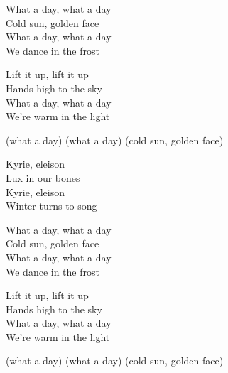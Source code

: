 \begin{lyrics}
What a day, what a day\\
Cold sun, golden face\\
What a day, what a day\\
We dance in the frost

Lift it up, lift it up\\
Hands high to the sky\\
What a day, what a day\\
We’re warm in the light

(what a day) (what a day)
(cold sun, golden face)

Kyrie, eleison\\
Lux in our bones\\
Kyrie, eleison\\
Winter turns to song

What a day, what a day\\
Cold sun, golden face\\
What a day, what a day\\
We dance in the frost

Lift it up, lift it up\\
Hands high to the sky\\
What a day, what a day\\
We’re warm in the light

(what a day) (what a day)
(cold sun, golden face)
\end{lyrics}

